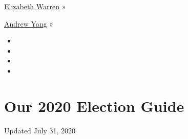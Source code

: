 \href{https://www.nytimes.com/interactive/2020/us/elections/elizabeth-warren.html}{Elizabeth
Warren} »

\href{https://www.nytimes.com/interactive/2020/us/elections/andrew-yang.html}{Andrew
Yang} »

\begin{itemize}
\item
\item
\item
\item
\end{itemize}

\hypertarget{our-2020-election-guide}{%
\section{Our 2020 Election Guide}\label{our-2020-election-guide}}

Updated July 31, 2020

